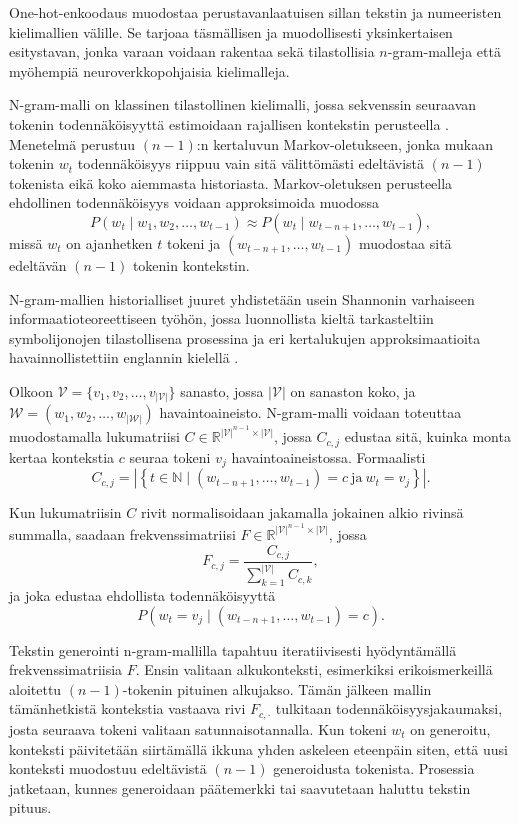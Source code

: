 One-hot-enkoodaus muodostaa perustavanlaatuisen sillan tekstin
ja numeeristen kielimallien välille. Se tarjoaa täsmällisen ja muodollisesti
yksinkertaisen esitystavan, jonka varaan voidaan rakentaa sekä tilastollisia
\(n\)-gram-malleja että myöhempiä neuroverkkopohjaisia kielimalleja.

N-gram-malli on klassinen tilastollinen kielimalli, jossa sekvenssin seuraavan
tokenin todennäköisyyttä estimoidaan rajallisen kontekstin perusteella \cite{jurafsky2023speech}.
Menetelmä perustuu \((n-1)\):n kertaluvun Markov-oletukseen, jonka mukaan
tokenin \(w_t\) todennäköisyys riippuu vain sitä välittömästi edeltävistä
\((n-1)\) tokenista eikä koko aiemmasta historiasta. Markov-oletuksen perusteella
ehdollinen todennäköisyys voidaan approksimoida muodossa
\[
  P(w_t \mid w_1, w_2, \ldots, w_{t-1})
  \approx
  P(w_t \mid w_{t-n+1}, \ldots, w_{t-1}),
\]
missä \(w_t\) on ajanhetken \(t\) tokeni ja
\((w_{t-n+1}, \ldots, w_{t-1})\) muodostaa sitä edeltävän
\((n-1)\) tokenin kontekstin.

N-gram-mallien historialliset juuret yhdistetään usein Shannonin varhaiseen
informaatioteoreettiseen työhön, jossa luonnollista kieltä tarkasteltiin
symbolijonojen tilastollisena prosessina ja eri kertalukujen approksimaatioita
havainnollistettiin englannin kielellä
\cite{shannon1948mathematical,shannon1951prediction}.

Olkoon \(\mathcal{V} = \{v_1, v_2, \ldots, v_{|\mathcal{V}|}\}\) sanasto, jossa \(|\mathcal{V}|\) on sanaston
koko, ja \(\mathcal{W} = (w_1, w_2, \ldots, w_{|\mathcal{W}|})\) havaintoaineisto. N-gram-malli
voidaan toteuttaa muodostamalla lukumatriisi
\(C \in \mathbb{R}^{|\mathcal{V}|^{n-1} \times |\mathcal{V}|}\), jossa \(C_{c,j}\) edustaa sitä,
kuinka monta kertaa kontekstia \(c\) seuraa tokeni \(v_j\)
havaintoaineistossa. Formaalisti
\[
  C_{c,j}
  =
  \left|
  \left\{
    t \in \mathbb{N}
    \mid
    (w_{t-n+1}, \ldots, w_{t-1}) = c
    \ \text{ja}\
    w_t = v_j
  \right\}
  \right|.
\]

Kun lukumatriisin \(C\) rivit normalisoidaan jakamalla jokainen alkio rivinsä
summalla, saadaan frekvenssimatriisi
\(F \in \mathbb{R}^{|\mathcal{V}|^{n-1} \times |\mathcal{V}|}\), jossa
\[
  F_{c,j}
  =
  \frac{C_{c,j}}{\sum_{k=1}^{|\mathcal{V}|} C_{c,k}},
\]
ja joka edustaa ehdollista todennäköisyyttä
\[
  P(w_t = v_j \mid (w_{t-n+1}, \ldots, w_{t-1}) = c).
\]

Tekstin generointi n-gram-mallilla tapahtuu iteratiivisesti hyödyntämällä
frekvenssimatriisia \(F\). Ensin valitaan alkukonteksti, esimerkiksi
erikoismerkeillä aloitettu \((n-1)\)-tokenin pituinen alkujakso. Tämän jälkeen
mallin tämänhetkistä kontekstia vastaava rivi \(F_{c,\cdot}\) tulkitaan
todennäköisyysjakaumaksi, josta seuraava tokeni valitaan satunnaisotannalla.
Kun tokeni \(w_t\) on generoitu, konteksti päivitetään siirtämällä ikkuna yhden
askeleen eteenpäin siten, että uusi konteksti muodostuu edeltävistä
\((n-1)\) generoidusta tokenista. Prosessia jatketaan, kunnes generoidaan
päätemerkki tai saavutetaan haluttu tekstin pituus.

